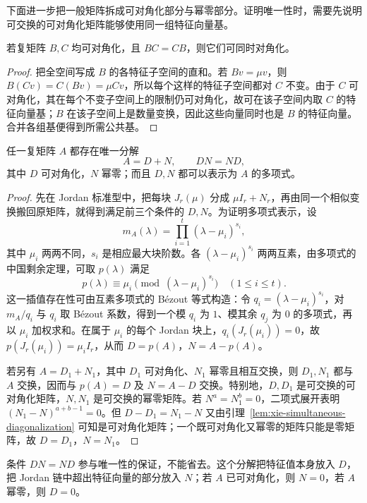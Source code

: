 下面进一步把一般矩阵拆成可对角化部分与幂零部分。证明唯一性时，需要先说明可交换的可对角化矩阵能够使用同一组特征向量基。

\begin{lemma}
\label{lem:xie-simultaneous-diagonalization}
若复矩阵 $B,C$ 均可对角化，且 $BC=CB$，则它们可同时对角化。
\end{lemma}
\begin{proof}
把全空间写成 $B$ 的各特征子空间的直和。若 $Bv=\mu v$，则 $B(Cv)=C(Bv)=\mu Cv$，所以每个这样的特征子空间都对 $C$ 不变。由于 $C$ 可对角化，其在每个不变子空间上的限制仍可对角化，故可在该子空间内取 $C$ 的特征向量基；$B$ 在该子空间上是数量变换，因此这些向量同时也是 $B$ 的特征向量。合并各组基便得到所需公共基。
\end{proof}

\begin{theorem}
\label{thm:xie-jordan-chevalley}
任一复矩阵 $A$ 都存在唯一分解
\begin{equation}
\label{eq:xie-jordan-chevalley}
    A=D+N,\qquad DN=ND,
\end{equation}
其中 $D$ 可对角化，$N$ 幂零；而且 $D,N$ 都可以表示为 $A$ 的多项式。
\end{theorem}
\begin{proof}
先在 Jordan 标准型中，把每块 $J_r(\mu)$ 分成 $\mu I_r+N_r$，再由同一个相似变换搬回原矩阵，就得到满足前三个条件的 $D,N$。为证明多项式表示，设
\[
    m_A(\lambda)=\prod_{i=1}^t(\lambda-\mu_i)^{s_i},
\]
其中 $\mu_i$ 两两不同，$s_i$ 是相应最大块阶数。各 $(\lambda-\mu_i)^{s_i}$ 两两互素，由多项式的中国剩余定理，可取 $p(\lambda)$ 满足
\[
    p(\lambda)\equiv\mu_i\pmod{(\lambda-\mu_i)^{s_i}}
    \quad(1\le i\le t).
\]
这一插值存在性可由互素多项式的 Bézout 等式构造：令 $q_i=(\lambda-\mu_i)^{s_i}$，对 $m_A/q_i$ 与 $q_i$ 取 Bézout 系数，得到一个模 $q_i$ 为 $1$、模其余 $q_j$ 为 $0$ 的多项式，再以 $\mu_i$ 加权求和。在属于 $\mu_i$ 的每个 Jordan 块上，$q_i(J_r(\mu_i))=0$，故 $p(J_r(\mu_i))=\mu_iI_r$，从而 $D=p(A)$，$N=A-p(A)$。

若另有 $A=D_1+N_1$，其中 $D_1$ 可对角化、$N_1$ 幂零且相互交换，则 $D_1,N_1$ 都与 $A$ 交换，因而与 $p(A)=D$ 及 $N=A-D$ 交换。特别地，$D,D_1$ 是可交换的可对角化矩阵，$N,N_1$ 是可交换的幂零矩阵。若 $N^a=N_1^b=0$，二项式展开表明 $(N_1-N)^{a+b-1}=0$。但 $D-D_1=N_1-N$ 又由引理~\ref{lem:xie-simultaneous-diagonalization} 可知是可对角化矩阵；一个既可对角化又幂零的矩阵只能是零矩阵，故 $D=D_1$，$N=N_1$。
\end{proof}

条件 $DN=ND$ 参与唯一性的保证，不能省去。这个分解把特征值本身放入 $D$，把 Jordan 链中超出特征向量的部分放入 $N$；若 $A$ 已可对角化，则 $N=0$，若 $A$ 幂零，则 $D=0$。

